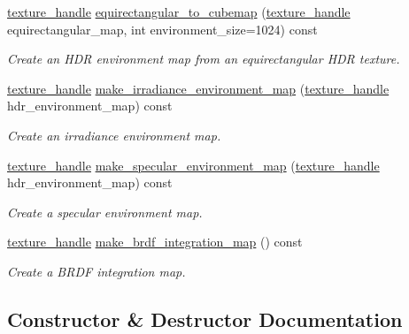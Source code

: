 \begin{DoxyCompactItemize}
\mbox{\hyperlink{structmoka_1_1texture__handle}{texture\+\_\+handle}} \mbox{\hyperlink{classmoka_1_1pbr__util_ad0063494b8f2fc1e2b0a79b70facbdd0}{equirectangular\+\_\+to\+\_\+cubemap}} (\mbox{\hyperlink{structmoka_1_1texture__handle}{texture\+\_\+handle}} equirectangular\+\_\+map, int environment\+\_\+size=1024) const
\begin{DoxyCompactList}\small\item\em Create an H\+DR environment map from an equirectangular H\+DR texture. \end{DoxyCompactList}\item 
\mbox{\hyperlink{structmoka_1_1texture__handle}{texture\+\_\+handle}} \mbox{\hyperlink{classmoka_1_1pbr__util_adec38254baf03a15c7c93ac871eac05e}{make\+\_\+irradiance\+\_\+environment\+\_\+map}} (\mbox{\hyperlink{structmoka_1_1texture__handle}{texture\+\_\+handle}} hdr\+\_\+environment\+\_\+map) const
\begin{DoxyCompactList}\small\item\em Create an irradiance environment map. \end{DoxyCompactList}\item 
\mbox{\hyperlink{structmoka_1_1texture__handle}{texture\+\_\+handle}} \mbox{\hyperlink{classmoka_1_1pbr__util_ac9c1b434ca30091fd08191485a8de41e}{make\+\_\+specular\+\_\+environment\+\_\+map}} (\mbox{\hyperlink{structmoka_1_1texture__handle}{texture\+\_\+handle}} hdr\+\_\+environment\+\_\+map) const
\begin{DoxyCompactList}\small\item\em Create a specular environment map. \end{DoxyCompactList}\item 
\mbox{\hyperlink{structmoka_1_1texture__handle}{texture\+\_\+handle}} \mbox{\hyperlink{classmoka_1_1pbr__util_a89ff10257ac7d9cce23c2a3c44aaae4c}{make\+\_\+brdf\+\_\+integration\+\_\+map}} () const
\begin{DoxyCompactList}\small\item\em Create a B\+R\+DF integration map. \end{DoxyCompactList}\end{DoxyCompactItemize}


\subsection{Constructor \& Destructor Documentation}
\mbox{\label{classmoka_1_1pbr__util_a2acd5e0c0e065f52e622d6e54cc6db65}} 

